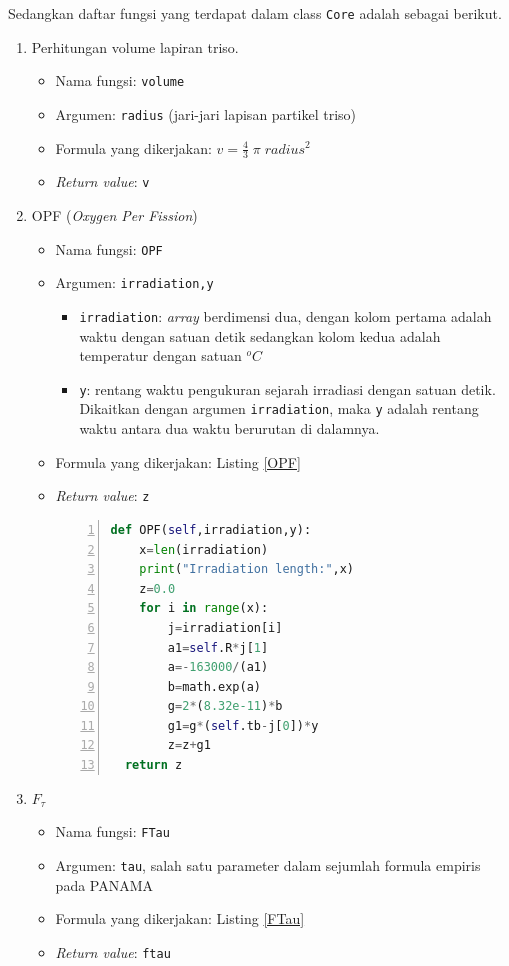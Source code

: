 \documentclass[a4paper,11pt]{report}
\begin{document}
Sedangkan daftar fungsi yang terdapat dalam class \texttt{Core} adalah sebagai berikut.
\begin{enumerate}
  \item Perhitungan volume lapiran triso.
  \begin{itemize}
    \item Nama fungsi: \texttt{volume}
    \item Argumen: \texttt{radius} (jari-jari lapisan partikel triso) 
    \item Formula yang dikerjakan: $v=\frac{4}{3}\;\pi\;radius^2$
    \item \textit{Return value}: \texttt{v}
  \end{itemize}
  \item OPF (\textit{Oxygen Per Fission})
  \begin{itemize}
    \item Nama fungsi: \texttt{OPF}
    \item Argumen: \texttt{irradiation,y}
    \begin{itemize}
      \item \texttt{irradiation}: \textit{array} berdimensi dua, dengan kolom pertama adalah waktu dengan satuan detik sedangkan kolom kedua adalah temperatur dengan satuan $^{o}C$
      \item \texttt{y}: rentang waktu pengukuran sejarah irradiasi dengan satuan detik. Dikaitkan dengan argumen \texttt{irradiation}, maka \texttt{y} adalah rentang waktu antara dua waktu berurutan di dalamnya.
    \end{itemize}
    \item Formula yang dikerjakan: Listing \ref{OPF}
    \item \textit{Return value}: \texttt{z}
    
\scriptsize
\begin{lstlisting}[language=python, numbers=left, numberstyle=\tiny, caption=Fungsi OPF, showstringspaces=false, label=OPF]
def OPF(self,irradiation,y):
	x=len(irradiation)
	print("Irradiation length:",x)
	z=0.0
	for i in range(x):
		j=irradiation[i]
		a1=self.R*j[1]
		a=-163000/(a1)
		b=math.exp(a)
		g=2*(8.32e-11)*b
		g1=g*(self.tb-j[0])*y
		z=z+g1
  return z
\end{lstlisting}
\normalsize
  \end{itemize}
  \item $F_{\tau}$
  \begin{itemize}
    \item Nama fungsi: \texttt{FTau}
    \item Argumen: \texttt{tau}, salah satu parameter dalam sejumlah formula empiris pada PANAMA \cite{report1}
    \item Formula yang dikerjakan: Listing \ref{FTau}
    \item \textit{Return value}: \texttt{ftau}
    

\end{itemize}
\end{enumerate}
\end{document}
